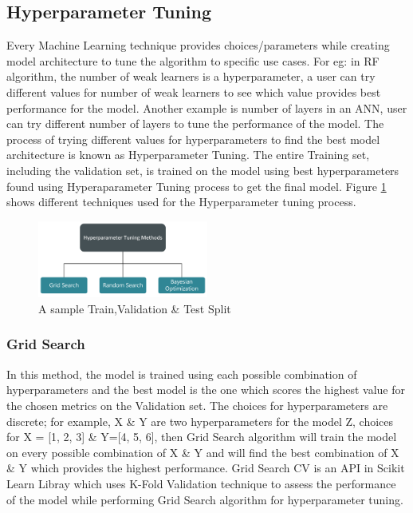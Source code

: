 \documentclass[twoside,11pt,a4paper]{article}
\begin{document}
\subsection{Hyperparameter Tuning}
Every Machine Learning technique provides choices/parameters while creating model architecture to tune the algorithm to specific use cases. For eg: in \acf{RF} algorithm, the number of weak learners is a hyperparameter, a user can try different values for number of weak learners to see which value provides best performance for the model. Another example is number of layers in an \acf{ANN}, user can try different number of layers to tune the performance of the model. The process of trying different values for hyperparameters to find the best model architecture is known as Hyperparameter Tuning. The entire Training set, including the validation set, is trained on the model using best hyperparameters found using Hyperaparameter Tuning process to get the final model. Figure \ref{fig:hyperparameter_tuning_methods} shows different techniques used for the Hyperparameter tuning process.\\
\begin{figure}[ht]
	\centering
	\includegraphics[width=0.5\textwidth]{hyperparameter_tuning_methods}
	\caption[A sample Train,Validation \& Test Split]{A sample Train,Validation \& Test Split}
	\label{fig:hyperparameter_tuning_methods}
\end{figure}
\FloatBarrier

\subsubsection{Grid Search} \label{sec:grid_search}
In this method, the model is trained using each possible combination of hyperparameters and the best model is the one which scores the highest value for the chosen metrics on the Validation set. The choices for hyperparameters are discrete; for example, X \& Y  are two hyperparameters for the model Z, choices for X = [1, 2, 3] \& Y=[4, 5, 6], then Grid Search algorithm will train the model on every possible combination of X \& Y and will find the best combination of X \& Y which provides the highest performance. Grid Search \acs{CV} is an API in Scikit Learn Libray which uses K-Fold Validation technique to assess the performance of the model while performing Grid Search algorithm for hyperparameter tuning.
\end{document}

